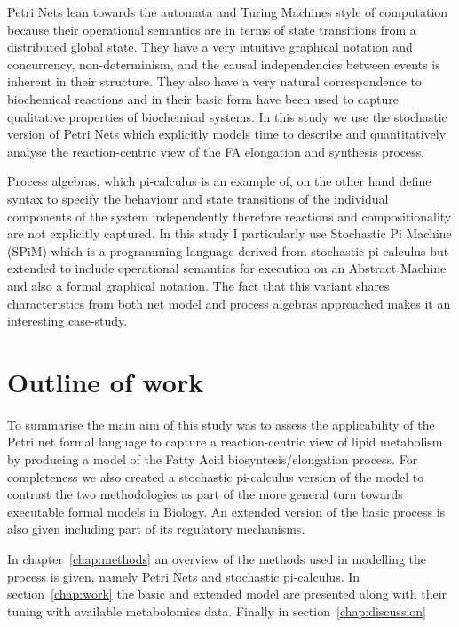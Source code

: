 Petri Nets lean towards the automata and Turing Machines style of
computation because their operational semantics are in terms of state
transitions from a distributed global state. They have a very intuitive
graphical notation and concurrency,
non-determinism, and the causal independencies between events is
inherent in their structure. They
also have a very natural correspondence to biochemical reactions and
in their basic form have been used to capture qualitative properties
of biochemical systems. In this study we use the stochastic version of
Petri Nets which explicitly models time to describe and quantitatively
analyse the
reaction-centric view of the FA elongation and synthesis
process. 

Process algebras, which pi-calculus is an example of, on the other
hand define syntax to specify the behaviour and state transitions of the individual
components of the system independently therefore reactions and
compositionality are not explicitly captured. In this study I
particularly use Stochastic Pi Machine (SPiM) which is a programming
language derived from stochastic pi-calculus but extended to include
operational semantics for execution on an Abstract Machine and also a
formal graphical notation. The fact that this variant shares
characteristics from both net model and process algebras approached
makes it an interesting case-study.

\section{Outline of work}
To summarise the main aim of this study was to assess the
applicability of the Petri net formal language to capture a
reaction-centric view of lipid metabolism by producing a model of the 
Fatty Acid biosyntesis/elongation process. For completeness we also
created a stochastic pi-calculus version of the model to contrast the
two methodologies as part of the more general turn towards executable
formal models in Biology. An extended version of the basic process is
also given including part of its regulatory mechanisms.

In chapter~\ref{chap:methods} an overview of the methods used in
modelling the process is given, namely Petri Nets and stochastic
pi-calculus. In section~\ref{chap:work} the basic and extended model
are presented along with their tuning with available metabolomics
data. Finally in section~\ref{chap:discussion} 

